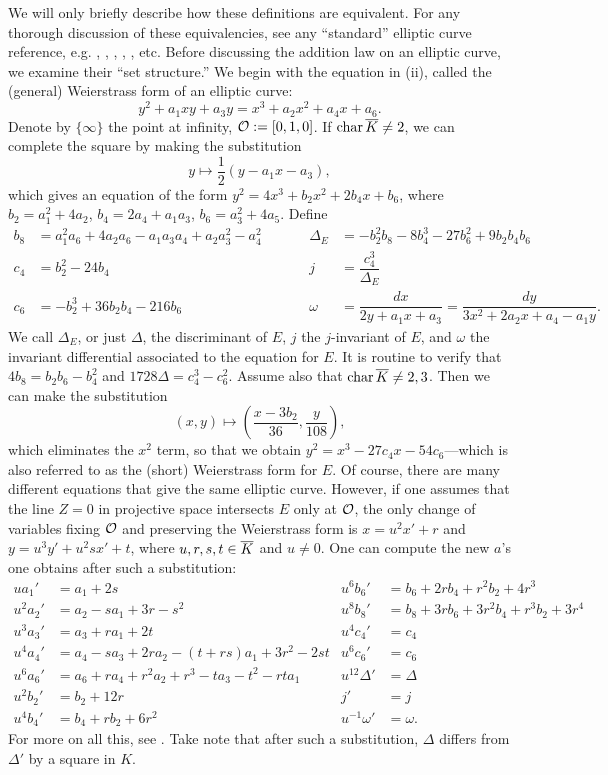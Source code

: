 We will only briefly describe how these definitions are equivalent. For any thorough discussion of these equivalencies, see any ``standard'' elliptic curve reference, e.g. \cite{husemoller04}, \cite{silvermanarithmetic}, \cite{washington03}, \cite{knapp92}, \cite{milne06}, etc. Before discussing the addition law on an elliptic curve, we examine their ``set structure.'' We begin with the equation in (ii), called the (general) Weierstrass form of an elliptic curve:
	\[
	y^2 + a_1xy + a_3y= x^3 + a_2x^2 + a_4x + a_6.
	\]
Denote by $\{ \infty \}$ the point at infinity, $\mathcal{O}:= [0,1,0]$. If $\operatorname{char} \overline{K} \neq 2$, we can complete the square by making the substitution
	\[
	y \mapsto \dfrac{1}{2} (y - a_1x - a_3),
	\]
which gives an equation of the form $y^2= 4x^3 + b_2x^2 + 2b_4x + b_6$, where $b_2= a_1^2 + 4a_2$, $b_4= 2a_4 + a_1a_3$, $b_6= a_3^2 + 4a_5$. Define
	\[
	\begin{aligned}
	b_8&= a_1^2a_6 + 4a_2a_6 - a_1a_3a_4 + a_2a_3^2 - a_4^2 &\quad&& \Delta_E&= -b_2^2b_8 - 8b_4^3 - 27b_6^2 + 9b_2b_4b_6 \\
	c_4&= b_2^2 - 24b_4 &&& j&= \dfrac{c_4^3}{\Delta_E} \\
	c_6&= -b_2^3 + 36b_2b_4 - 216b_6 &&& \omega&= \dfrac{dx}{2y + a_1x + a_3}= \dfrac{dy}{3x^2 + 2a_2x + a_4 - a_1y}.
	\end{aligned}
	\]
We call $\Delta_E$, or just $\Delta$, the discriminant of $E$, $j$ the $j$-invariant of $E$, and $\omega$ the invariant differential associated to the equation for $E$. It is routine to verify that $4b_8= b_2b_6 - b_4^2$ and $1728\Delta= c_4^3 - c_6^2$. Assume also that $\operatorname{char} \overline{K} \neq 2, 3$. Then we can make the substitution
	\[
	(x,y) \mapsto \left( \dfrac{x - 3b_2}{36}, \dfrac{y}{108} \right),
	\]
which eliminates the $x^2$ term, so that we obtain $y^2= x^3 - 27c_4x - 54c_6$---which is also referred to as the (short) Weierstrass form for $E$. Of course, there are many different equations that give the same elliptic curve. However, if one assumes that the line $Z= 0$ in projective space intersects $E$ only at $\mathcal{O}$, the only change of variables fixing $\mathcal{O}$ and preserving the Weierstrass form is $x= u^2x' + r$ and $y= u^3y' + u^2sx' + t$, where $u,r,s,t \in \overline{K}$ and $u \neq 0$. One can compute the new $a$'s one obtains after such a substitution:
	\[
	\begin{aligned}
	ua_1'&= a_1 + 2s & u^6b_6'&= b_6 + 2rb_4 + r^2b_2 + 4r^3 \\
	u^2a_2'&= a_2 - sa_1 + 3r - s^2 & u^8b_8'&= b_8 + 3rb_6 + 3r^2b_4 + r^3b_2 + 3r^4 \\
	u^3a_3'&= a_3 + ra_1 + 2t & u^4c_4'&= c_4 \\
	u^4a_4'&= a_4 - sa_3 + 2ra_2 - (t + rs)a_1 + 3r^2 - 2st & u^6c_6'&= c_6 \\
	u^6a_6'&= a_6 + ra_4 + r^2a_2 + r^3 - ta_3 - t^2 - rta_1 & u^{12}\Delta'&= \Delta \\
	u^2b_2'&= b_2 + 12r & j'&= j \\
	u^4b_4'&= b_4 + rb_2 + 6r^2 & u^{-1}\omega'&= \omega.
	\end{aligned}
	\]
For more on all this, see \cite[III.1]{silvermanarithmetic}. Take note that after such a substitution, $\Delta$ differs from $\Delta'$ by a square in $K$. 


